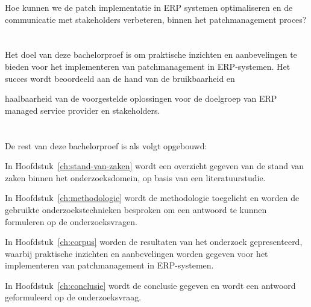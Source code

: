 Hoe kunnen we de patch implementatie in ERP systemen optimaliseren en de communicatie met stakeholders verbeteren, binnen het patchmanagement proces?

\section{}%
\label{sec:onderzoeksdoelstelling}

Het doel van deze bachelorproef is om praktische inzichten en aanbevelingen te bieden voor het implementeren van patchmanagement in ERP-systemen. Het succes wordt beoordeeld aan de hand van de bruikbaarheid en 

haalbaarheid van de voorgestelde oplossingen voor de doelgroep van ERP managed service provider en stakeholders.

\section{}%
\label{sec:opzet-bachelorproef}

De rest van deze bachelorproef is als volgt opgebouwd:


In Hoofdstuk~\ref{ch:stand-van-zaken} wordt een overzicht gegeven van de stand van zaken binnen het onderzoeksdomein, op basis van een literatuurstudie.

In Hoofdstuk~\ref{ch:methodologie} wordt de methodologie toegelicht en worden de gebruikte onderzoekstechnieken besproken om een antwoord te kunnen formuleren op de onderzoeksvragen.

In Hoofdstuk~\ref{ch:corpus} worden de resultaten van het onderzoek gepresenteerd, waarbij praktische inzichten en aanbevelingen worden gegeven voor het implementeren van patchmanagement in ERP-systemen.

In Hoofdstuk~\ref{ch:conclusie} wordt de conclusie gegeven en wordt een antwoord geformuleerd op de onderzoeksvraag. 

